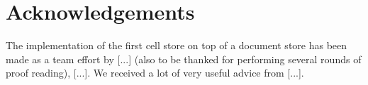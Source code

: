 \documentclass{acm_proc_article-sp}
\begin{document}
\section{Acknowledgements}

The implementation of the first cell store on top of a document store has been made as a team effort by [...] (also to be thanked for performing several rounds of proof reading), [...]. We received a lot of very useful advice from [...].



\end{document}
